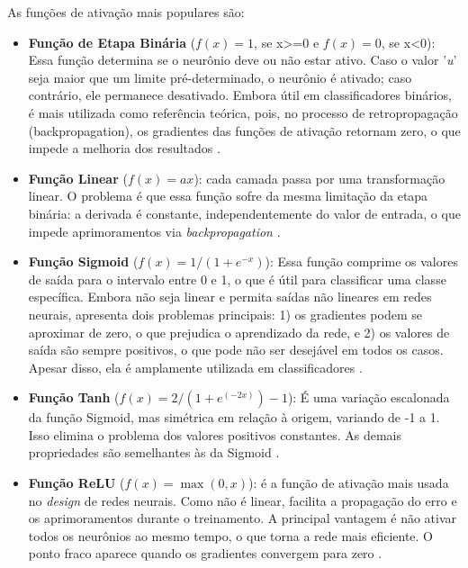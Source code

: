 As funções de ativação mais populares são:

\begin{itemize}
    \item \textbf{Função de Etapa Binária} ($ f(x) = 1$, se x>=0 e $f(x) = 0$, se x<0): Essa função determina se o neurônio deve ou não estar ativo. Caso o valor '\textit{u}' seja maior que um limite pré-determinado, o neurônio é ativado; caso contrário, ele permanece desativado. Embora útil em classificadores binários, é mais utilizada como referência teórica, pois, no processo de retropropagação (backpropagation), os gradientes das funções de ativação retornam zero, o que impede a melhoria dos resultados \cite{feng2019}.

    \item \textbf{Função Linear} ($f(x) = ax$): cada camada passa por uma transformação linear. O problema é que essa função sofre da mesma limitação da etapa binária: a derivada é constante, independentemente do valor de entrada, o que impede aprimoramentos via \textit{backpropagation} \cite{feng2019}.

    \item \textbf{Função Sigmoid} ($ f (x) = 1 / (1 + e^{-x}) $): Essa função comprime os valores de saída para o intervalo entre 0 e 1, o que é útil para classificar uma classe específica. Embora não seja linear e permita saídas não lineares em redes neurais, apresenta dois problemas principais: 1) os gradientes podem se aproximar de zero, o que prejudica o aprendizado da rede, e 2) os valores de saída são sempre positivos, o que pode não ser desejável em todos os casos. Apesar disso, ela é amplamente utilizada em classificadores \cite{feng2019}.

    \item \textbf{Função Tanh} ($f (x) = 2 / (1 + e ^{(-2x)}) -1$): É uma variação escalonada da função Sigmoid, mas simétrica em relação à origem, variando de -1 a 1. Isso elimina o problema dos valores positivos constantes. As demais propriedades são semelhantes às da Sigmoid \cite{feng2019}.

    \item \textbf{Função ReLU} ($f(x) = \max(0,x)$): é a função de ativação mais usada no \textit{design} de redes neurais. Como não é linear, facilita a propagação do erro e os aprimoramentos durante o treinamento. A principal vantagem é não ativar todos os neurônios ao mesmo tempo, o que torna a rede mais eficiente. O ponto fraco aparece quando os gradientes convergem para zero \cite{feng2019}.


\end{itemize}
